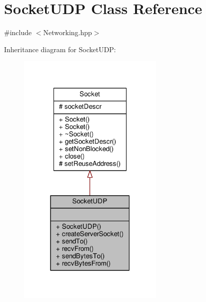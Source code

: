 \hypertarget{class_socket_u_d_p}{\section{Socket\-U\-D\-P Class Reference}
\label{class_socket_u_d_p}
}


{\ttfamily \#include $<$Networking.\-hpp$>$}



Inheritance diagram for Socket\-U\-D\-P\-:
\nopagebreak
\begin{figure}[H]
\begin{center}
\leavevmode
\includegraphics[width=198pt]{class_socket_u_d_p__inherit__graph}
\end{center}
\end{figure}


